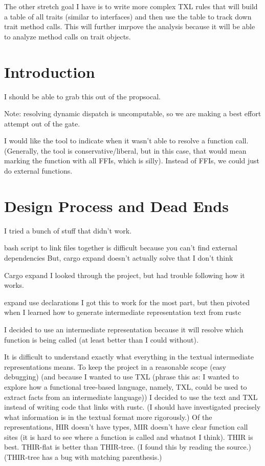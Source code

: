 \documentclass[11pt]{article}
\begin{document}
The other stretch goal I have is to write more complex TXL rules that will build a table of all traits (similar to interfaces) and then use the table to track down trait method calls.
This will further imrpove the analysis because it will be able to analyze method calls on trait objects.

\section{Introduction}
I should be able to grab this out of the propsocal.

Note: resolving dynamic dispatch is uncomputable, so we are making a best effort attempt out of the gate.

I would like the tool to indicate when it wasn't able to resolve a function call.
(Generally, the tool is conservative/liberal, but in this case, that would mean marking the function with all FFIs, which is silly).
Instead of FFIs, we could just do external functions.

\section{Design Process and Dead Ends}
I tried a bunch of stuff that didn't work.

bash script to link files together is difficult because you can't find external dependencies
But, cargo expand doesn't actually solve that I don't think

Cargo expand
I looked through the project, but had trouble following how it works.

expand use declarations
I got this to work for the most part, but then pivoted when I learned how to generate intermediate representation text from rustc

I decided to use an intermediate representation because it will resolve which function is being called (at least better than I could without).

It is difficult to understand exactly what everything in the textual intermediate representations means.
To keep the project in a reasonable scope (easy debugging) (and because I wanted to use TXL (phrase this as: I wanted to explore how a functional tree-based language, namely, TXL, could be used to extract facts from an intermediate language)) I decided to use the text and TXL instead of writing code that links with rustc.
(I should have investigated precisely what information is in the textual format more rigorously.)
Of the representations, HIR doesn't have types, MIR doesn't have clear function call sites (it is hard to see where a function is called and whatnot I think).
THIR is best.
THIR-flat is better than THIR-tree. (I found this by reading the source.)
(THIR-tree has a bug with matching parenthesis.)
\end{document}
